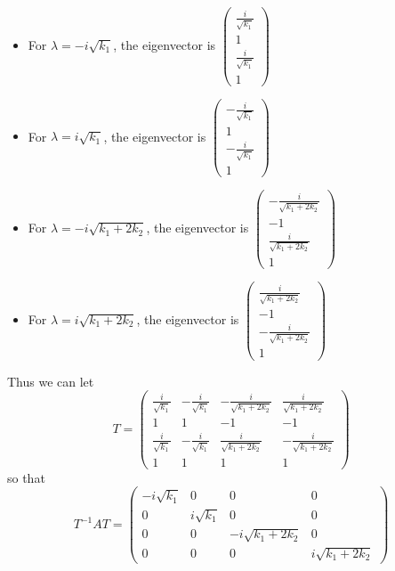 \documentclass[11pt]{article}
\theoremstyle{mystyle}
\theoremstyle{definition}
\begin{document}
\begin{itemize}
  \item For $\lambda = -i\sqrt{k_1}$, the eigenvector is $
    \begin{pmatrix}
      \displaystyle\frac{i}{\sqrt{k_1}} \\ 1 \\ \displaystyle\frac{i}{\sqrt{k_1}} \\ 1
    \end{pmatrix}$
  \item For $\lambda = i\sqrt{k_1}$, the eigenvector is $
    \begin{pmatrix}
      -\displaystyle\frac{i}{\sqrt{k_1}} \\ 1 \\ -\displaystyle\frac{i}{\sqrt{k_1}} \\ 1
    \end{pmatrix}$
  \item For $\lambda = -i\sqrt{k_1 + 2k_2}$, the eigenvector is $
    \begin{pmatrix}
      -\displaystyle\frac{i}{\sqrt{k_1 + 2k_2}} \\ -1 \\ \displaystyle\frac{i}{\sqrt{k_1 + 2k_2}} \\ 1
    \end{pmatrix}$
  \item For $\lambda = i\sqrt{k_1 + 2k_2}$, the eigenvector is $
    \begin{pmatrix}
      \displaystyle\frac{i}{\sqrt{k_1 + 2k_2}} \\ -1 \\ - \displaystyle\frac{i}{\sqrt{k_1 + 2k_2}} \\ 1
    \end{pmatrix}$
\end{itemize}
Thus we can let 
\[
  T = 
  \begin{pmatrix} 
    \displaystyle\frac{i}{\sqrt{k_1}} & -\displaystyle\frac{i}{\sqrt{k_1}} & -\displaystyle\frac{i}{\sqrt{k_1 + 2k_2}} &  \displaystyle\frac{i}{\sqrt{k_1 + 2k_2}} \\
    1 & 1 & - 1 & -1\\ 
    \displaystyle\frac{i}{\sqrt{k_1}} & -\displaystyle\frac{i}{\sqrt{k_1}} &  \displaystyle\frac{i}{\sqrt{k_1 + 2k_2}} &  -\displaystyle\frac{i}{\sqrt{k_1 + 2k_2}}   \\ 
    1 & 1 & 1 & 1
  \end{pmatrix}
\]
so that 
\[
  T^{-1}AT =  
  \begin{pmatrix}
    -i\sqrt{k_1} & 0 & 0 & 0\\
    0 & i\sqrt{k_1} & 0 & 0 \\
    0 & 0 & -i\sqrt{k_1 + 2k_2} &0 \\
    0 & 0 & 0 & i\sqrt{k_1 + 2k_2}
  \end{pmatrix}
\]
\end{document}
